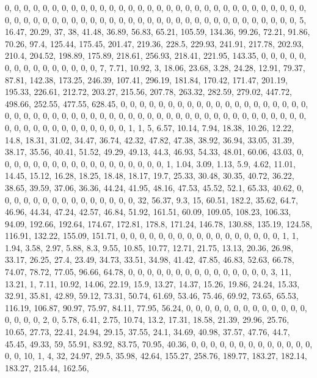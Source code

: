 \documentclass[
]{article}
\begin{document}
0, 0, 0, 0, 0, 0, 0, 0, 0, 0, 0, 0, 0, 0, 0, 0, 0, 0, 0, 0, 0, 0, 0, 0,
0, 0, 0, 0, 0, 0, 0, 0, 0, 0, 0, 0, 0, 0, 0, 0, 0, 0, 0, 0, 0, 0, 0, 0,
0, 0, 0, 0, 0, 0, 0, 0, 0, 0, 0, 0, 0, 0, 0, 5, 16.47, 20.29, 37, 38,
41.48, 36.89, 56.83, 65.21, 105.59, 134.36, 99.26, 72.21, 91.86, 70.26,
97.4, 125.44, 175.45, 201.47, 219.36, 228.5, 229.93, 241.91, 217.78,
202.93, 210.4, 204.52, 198.89, 175.89, 218.61, 256.93, 218.41, 221.95,
143.35, 0, 0, 0, 0, 0, 0, 0, 0, 0, 0, 0, 0, 0, 0, 0, 7, 7.71, 10.92, 3,
18.06, 23.68, 3.28, 24.28, 12.91, 79.37, 87.81, 142.38, 173.25, 246.39,
107.41, 296.19, 181.84, 170.42, 171.47, 201.19, 195.33, 226.61, 212.72,
203.27, 215.56, 207.78, 263.32, 282.59, 279.02, 447.72, 498.66, 252.55,
477.55, 628.45, 0, 0, 0, 0, 0, 0, 0, 0, 0, 0, 0, 0, 0, 0, 0, 0, 0, 0, 0,
0, 0, 0, 0, 0, 0, 0, 0, 0, 0, 0, 0, 0, 0, 0, 0, 0, 0, 0, 0, 0, 0, 0, 0,
0, 0, 0, 0, 0, 0, 0, 0, 0, 0, 0, 0, 0, 0, 0, 0, 0, 0, 0, 0, 0, 0, 1, 1,
5, 6.57, 10.14, 7.94, 18.38, 10.26, 12.22, 14.8, 18.31, 31.02, 34.47,
36.74, 42.32, 47.82, 47.38, 38.92, 36.94, 33.05, 31.39, 38.17, 35.56,
40.41, 51.52, 49.29, 49.13, 44.3, 46.93, 54.33, 48.01, 60.06, 43.03, 0,
0, 0, 0, 0, 0, 0, 0, 0, 0, 0, 0, 0, 0, 0, 0, 0, 0, 1, 1.04, 3.09, 1.13,
5.9, 4.62, 11.01, 14.45, 15.12, 16.28, 18.25, 18.48, 18.17, 19.7, 25.33,
30.48, 30.35, 40.72, 36.22, 38.65, 39.59, 37.06, 36.36, 44.24, 41.95,
48.16, 47.53, 45.52, 52.1, 65.33, 40.62, 0, 0, 0, 0, 0, 0, 0, 0, 0, 0,
0, 0, 0, 0, 0, 32, 56.37, 9.3, 15, 60.51, 182.2, 35.62, 64.7, 46.96,
44.34, 47.24, 42.57, 46.84, 51.92, 161.51, 60.09, 109.05, 108.23,
106.33, 94.09, 192.66, 192.64, 174.67, 172.81, 178.8, 171.24, 146.78,
130.88, 135.19, 124.58, 116.91, 132.22, 155.09, 151.71, 0, 0, 0, 0, 0,
0, 0, 0, 0, 0, 0, 0, 0, 0, 0, 0, 0, 1, 1, 1.94, 3.58, 2.97, 5.88, 8.3,
9.55, 10.85, 10.77, 12.71, 21.75, 13.13, 20.36, 26.98, 33.17, 26.25,
27.4, 23.49, 34.73, 33.51, 34.98, 41.42, 47.85, 46.83, 52.63, 66.78,
74.07, 78.72, 77.05, 96.66, 64.78, 0, 0, 0, 0, 0, 0, 0, 0, 0, 0, 0, 0,
0, 0, 0, 3, 11, 13.21, 1, 7.11, 10.92, 14.06, 22.19, 15.9, 13.27, 14.37,
15.26, 19.86, 24.24, 15.33, 32.91, 35.81, 42.89, 59.12, 73.31, 50.74,
61.69, 53.46, 75.46, 69.92, 73.65, 65.53, 116.19, 106.87, 90.97, 75.97,
84.11, 77.95, 56.24, 0, 0, 0, 0, 0, 0, 0, 0, 0, 0, 0, 0, 0, 0, 0, 0, 0,
2, 0, 5.78, 6.41, 2.75, 10.74, 13.2, 17.31, 18.58, 21.39, 29.96, 25.76,
10.65, 27.73, 22.41, 24.94, 29.15, 37.55, 24.1, 34.69, 40.98, 37.57,
47.76, 44.7, 45.45, 49.33, 59, 55.91, 83.92, 83.75, 70.95, 40.36, 0, 0,
0, 0, 0, 0, 0, 0, 0, 0, 0, 0, 0, 0, 0, 10, 1, 4, 32, 24.97, 29.5, 35.98,
42.64, 155.27, 258.76, 189.77, 183.27, 182.14, 183.27, 215.44, 162.56,
\end{document}
